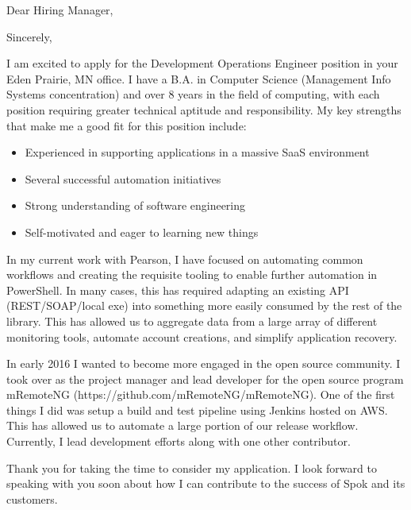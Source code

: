 \documentclass[12pt,sans]{moderncv}
\begin{document}
	\date{March 29, 2017}
	\opening{Dear Hiring Manager,}
	\closing{Sincerely,}
	\makelettertitle


	\qquad I am excited to apply for the Development Operations Engineer position in your Eden Prairie, MN office. I have a B.A. in Computer Science (Management Info Systems concentration) and over 8 years in the field of computing, with each position requiring greater technical aptitude and responsibility. My key strengths that make me a good fit for this position include:
	\begin{itemize}[leftmargin=.5in]
		\item Experienced in supporting applications in a massive SaaS environment
		\item Several successful automation initiatives
		\item Strong understanding of software engineering
		\item Self-motivated and eager to learning new things
	\end{itemize}

	\qquad In my current work with Pearson, I have focused on automating common workflows and creating the requisite tooling to enable further automation in PowerShell. In many cases, this has required adapting an existing API (REST/SOAP/local exe) into something more easily consumed by the rest of the library. This has allowed us to aggregate data from a large array of different monitoring tools, automate account creations, and simplify application recovery.
	
	\qquad In early 2016 I wanted to become more engaged in the open source community. I took over as the project manager and lead developer for the open source program mRemoteNG (https://github.com/mRemoteNG/mRemoteNG). One of the first things I did was setup a build and test pipeline using Jenkins hosted on AWS. This has allowed us to automate a large portion of our release workflow. Currently, I lead development efforts along with one other contributor.

	Thank you for taking the time to consider my application. I look forward to speaking with you soon about how I can contribute to the success of Spok and its customers.


	\makeletterclosing
\end{document}
